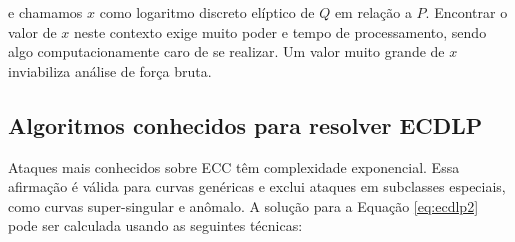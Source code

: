 e chamamos \(x\) como logaritmo discreto elíptico de \(Q\) em relação a \(P\). \cite{Hoffstein:2008} Encontrar o valor de \(x\) neste contexto exige muito poder e tempo de processamento, sendo algo computacionamente caro de se realizar. Um valor muito grande de \(x\) inviabiliza análise de força bruta.

%
%
\subsection{Algoritmos conhecidos para resolver ECDLP}
Ataques mais conhecidos sobre ECC têm complexidade exponencial. Essa afirmação é válida para curvas genéricas e exclui ataques em subclasses especiais, como curvas super-singular e anômalo. A solução para a Equação \ref{eq:ecdlp2} pode ser calculada usando as seguintes técnicas: \cite{Pelzl:2006}


